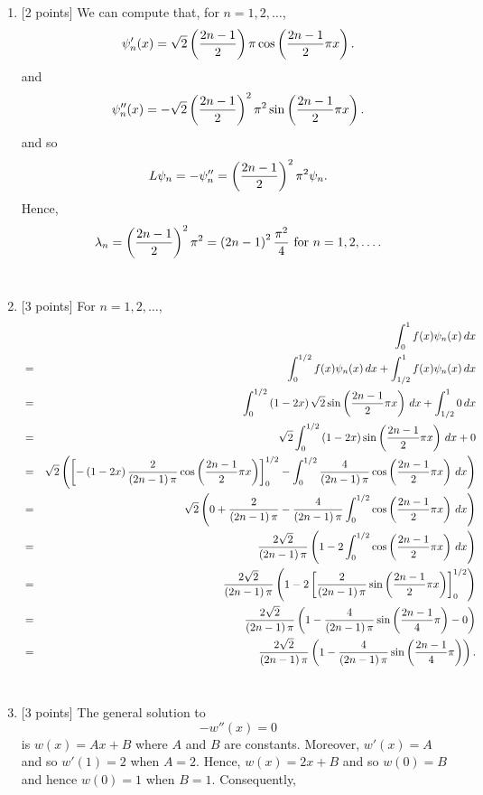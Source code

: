 \begin{solution}
\begin{enumerate}
\item {[2 points]} We can compute that, for $n=1,2,\ldots$,
\[
\psi_n'(x)=\sqrt{2} \left({2n-1\over 2}\right) \pi \cos\left({2n-1\over 2} \pi x\right).
\]
and
\[
\psi_n''(x)=-\sqrt{2} \left({2n-1\over 2}\right)^2 \pi^2 \sin\left({2n-1\over 2} \pi x\right).
\]
and so
\[
L\psi_n=-\psi_n''=\left({2n-1\over 2}\right)^2\pi^2\psi_n.
\]
Hence,
\[
\lambda_n = \left({2n-1\over 2}\right)^2 \pi^2 = \left(2n-1\right)^2 {\pi^2\over4}\mbox{ for } n = 1, 2, \ldots.
\]
\\
\item {[3 points]} For $n=1,2,\ldots$,
\begin{eqnarray*}
&&\int_0^1f(x)\psi_n(x)\,dx
\\
&=&\int_0^{1/2}f(x)\psi_n(x)\,dx+\int_{1/2}^1f(x)\psi_n(x)\,dx
\\
&=&\int_0^{1/2}\left(1-2x\right)\sqrt{2}\sin\left({2n-1\over 2}\pi x\right)\,dx+\int_{1/2}^10\,dx
\\
&=&\sqrt{2}\int_0^{1/2}\left(1-2x\right)\sin\left({2n-1\over 2}\pi x\right)\,dx+0
\\
&=&\sqrt{2}\left(\left[-\left(1-2x\right){2\over \left(2n-1\right)\pi}\cos\left({2n-1\over 2}\pi x\right)\right]_0^{1/2}-\int_0^{1/2}{4\over \left(2n-1\right)\pi}\cos\left({2n-1\over 2}\pi x\right)\,dx\right)
\\
&=&\sqrt{2}\left(0+{2\over \left(2n-1\right)\pi}-{4\over \left(2n-1\right)\pi}\int_0^{1/2}\cos\left({2n-1\over 2}\pi x\right)\,dx\right)
\\
&=&{2\sqrt{2}\over \left(2n-1\right)\pi}\left(1-2\int_0^{1/2}\cos\left({2n-1\over 2}\pi x\right)\,dx\right)
\\
&=&{2\sqrt{2}\over \left(2n-1\right)\pi}\left(1-2\left[{2\over \left(2n-1\right)\pi}\sin\left({2n-1\over 2}\pi x\right)\right]_0^{1/2}\right)
\\
&=&{2\sqrt{2}\over \left(2n-1\right)\pi}\left(1-{4\over \left(2n-1\right)\pi}\sin\left({2n-1\over 4}\pi\right)-0\right)
\\
&=&{2\sqrt{2}\over \left(2n-1\right)\pi}\left(1-{4\over \left(2n-1\right)\pi}\sin\left({2n-1\over 4}\pi\right)\right).
\end{eqnarray*}
\\
\item {[3 points]} The general solution to
\[
-w''(x)=0
\]
is $w(x)=Ax+B$ where $A$ and $B$ are constants. Moreover, $w'(x)=A$ and so $w'(1)=2$ when $A=2$. Hence, $w(x)=2x+B$ and so $w(0)=B$ and hence $w(0)=1$ when $B=1$. Consequently,

\end{enumerate}
\end{solution}
